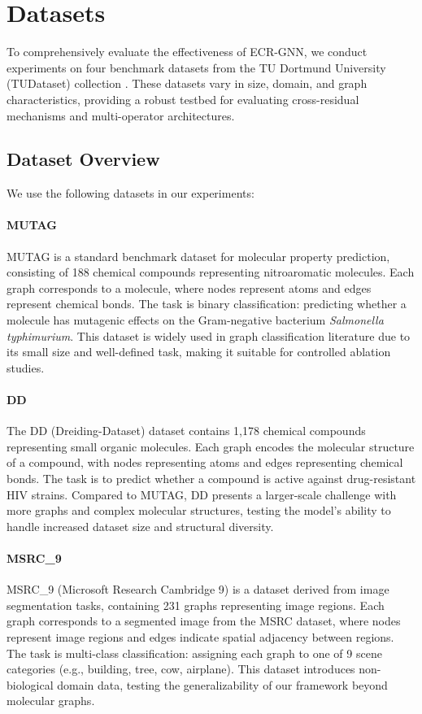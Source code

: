 \section{Datasets}
\label{sec:datasets}

To comprehensively evaluate the effectiveness of ECR-GNN, we conduct experiments on four benchmark datasets from the TU Dortmund University (TUDataset) collection \cite{keriven2020benchmark}. These datasets vary in size, domain, and graph characteristics, providing a robust testbed for evaluating cross-residual mechanisms and multi-operator architectures.

\subsection{Dataset Overview}

We use the following datasets in our experiments:

\paragraph{MUTAG}
MUTAG is a standard benchmark dataset for molecular property prediction, consisting of 188 chemical compounds representing nitroaromatic molecules. Each graph corresponds to a molecule, where nodes represent atoms and edges represent chemical bonds. The task is binary classification: predicting whether a molecule has mutagenic effects on the Gram-negative bacterium \textit{Salmonella typhimurium}. This dataset is widely used in graph classification literature due to its small size and well-defined task, making it suitable for controlled ablation studies.

\paragraph{DD}
The DD (Dreiding-Dataset) dataset contains 1,178 chemical compounds representing small organic molecules. Each graph encodes the molecular structure of a compound, with nodes representing atoms and edges representing chemical bonds. The task is to predict whether a compound is active against drug-resistant HIV strains. Compared to MUTAG, DD presents a larger-scale challenge with more graphs and complex molecular structures, testing the model's ability to handle increased dataset size and structural diversity.

\paragraph{MSRC\_9}
MSRC\_9 (Microsoft Research Cambridge 9) is a dataset derived from image segmentation tasks, containing 231 graphs representing image regions. Each graph corresponds to a segmented image from the MSRC dataset, where nodes represent image regions and edges indicate spatial adjacency between regions. The task is multi-class classification: assigning each graph to one of 9 scene categories (e.g., building, tree, cow, airplane). This dataset introduces non-biological domain data, testing the generalizability of our framework beyond molecular graphs.

